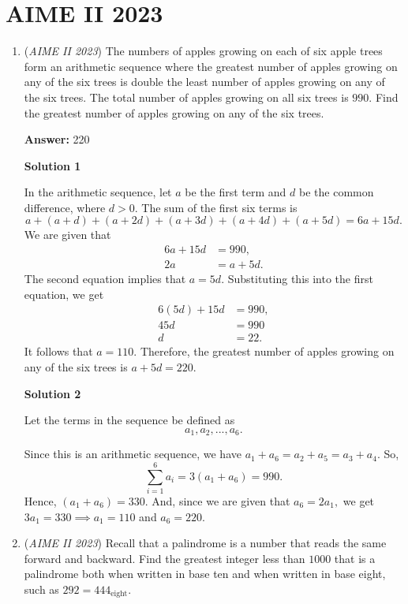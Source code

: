 \section{AIME II 2023}
        \begin{enumerate}
        	\item (\textit{AIME II 2023}) The numbers of apples growing on each of six apple trees form an arithmetic sequence where the greatest number of apples growing on any of the six trees is double the least number of apples growing on any of the six trees. The total number of apples growing on all six trees is $990.$ Find the greatest number of apples growing on any of the six trees.


 
 \textbf{Answer: }220



\textbf{Solution 1}

In the arithmetic sequence, let $a$ be the first term and $d$ be the common difference, where $d>0.$ The sum of the first six terms is 
 \[a+(a+d)+(a+2d)+(a+3d)+(a+4d)+(a+5d) = 6a+15d.\]We are given that
 \begin{align*} 6a+15d &= 990, \\ 2a &= a+5d. \end{align*}
The second equation implies that $a=5d.$ Substituting this into the first equation, we get 
 \begin{align*} 6(5d)+15d &=990, \\ 45d &= 990 \\ d &= 22. \end{align*}
It follows that $a=110.$ Therefore, the greatest number of apples growing on any of the six trees is $a+5d=\boxed{220}.$




\textbf{Solution 2}

Let the terms in the sequence be defined as 
 \[a_1, a_2, ..., a_6.\] 

 Since this is an arithmetic sequence, we have $a_1+a_6=a_2+a_5=a_3+a_4.$ So, 
 \[\sum_{i=1}^6 a_i=3(a_1+a_6)=990.\] Hence, $(a_1+a_6)=330.$ And, since we are given that $a_6=2a_1,$ we get $3a_1=330\implies a_1=110$ and $a_6=\boxed{220}.$



	\item (\textit{AIME II 2023}) Recall that a palindrome is a number that reads the same forward and backward. Find the greatest integer less than $1000$ that is a palindrome both when written in base ten and when written in base eight, such as $292 = 444_{\text{eight}}.$


\end{enumerate}
